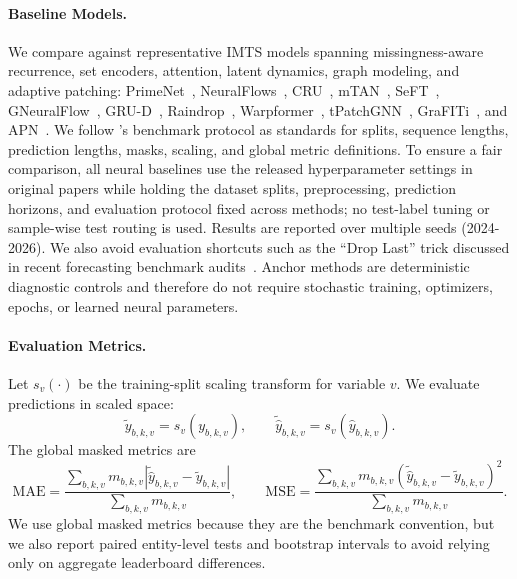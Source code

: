 \documentclass{article}
\begin{document}
\paragraph{Baseline Models.}
We compare against representative IMTS models spanning missingness-aware
recurrence, set encoders, attention, latent dynamics, graph modeling, and
adaptive patching: PrimeNet~\citep{primenet}, NeuralFlows~\citep{neuralflows2},
CRU~\citep{cru}, mTAN~\citep{mtan}, SeFT~\citep{seft}, GNeuralFlow~\citep{gneuralflow},
GRU-D~\citep{grud}, Raindrop~\citep{raindrop2}, Warpformer~\citep{warpformer},
tPatchGNN~\citep{tPatchGNN}, GraFITi~\citep{grafiti}, and APN~\citep{apn}. We
follow \citet{apn}'s benchmark protocol as standards for splits, sequence lengths,
prediction lengths, masks, scaling, and global metric definitions. To ensure a fair comparison, all neural
baselines use the released hyperparameter
settings in original papers while
holding the dataset splits, preprocessing, prediction horizons, and evaluation
protocol fixed across methods; no test-label tuning or sample-wise test routing is used.
Results are reported over multiple seeds (2024-2026). We also avoid evaluation shortcuts such as the ``Drop Last'' trick
discussed in recent forecasting benchmark audits~\citep{TFB2024,TimeRecipe2026}.
Anchor methods are deterministic diagnostic controls and therefore do not require
stochastic training, optimizers, epochs, or learned neural parameters.

\paragraph{Evaluation Metrics.}
Let $s_v(\cdot)$ be the training-split scaling transform for variable $v$. We
evaluate predictions in scaled space:
\begin{equation}
    \widetilde y_{b,k,v}=s_v(y_{b,k,v}),\qquad
    \widetilde{\hat y}_{b,k,v}=s_v(\hat y_{b,k,v}).
\end{equation}
The global masked metrics are
\begin{equation}
    \mathrm{MAE}=\frac{\sum_{b,k,v}m_{b,k,v}
    |\widetilde{\hat y}_{b,k,v}-\widetilde y_{b,k,v}|}
    {\sum_{b,k,v}m_{b,k,v}},
    \qquad
    \mathrm{MSE}=\frac{\sum_{b,k,v}m_{b,k,v}
    (\widetilde{\hat y}_{b,k,v}-\widetilde y_{b,k,v})^2}
    {\sum_{b,k,v}m_{b,k,v}}.
\end{equation}
We use global masked metrics because they are the benchmark convention, but we
also report paired entity-level tests and bootstrap intervals to avoid relying
only on aggregate leaderboard differences.
\end{document}
